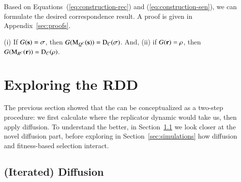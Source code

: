 \documentclass[fleqn,reqno,10pt]{article}
\renewcommand{\Smixed}{\ensuremath{\mathrm{\mathbf{s}}}}
\renewcommand{\Rmixed}{\ensuremath{\mathrm{\mathbf{r}}}}
\newcommand{\rdd}{\acro{rdd}} %
\newcommand{\Diff}{\ensuremath{\mathrm{D}}} %
\newcommand{\Mutate}{\ensuremath{\mathrm{M}}} %
\begin{document}
Based on Equations~(\ref{eq:construction-rec}) and
(\ref{eq:construction-sen}), we can formulate the desired
correspondence result. A proof is given in Appendix~\ref{sec:proofs}.

\begin{theorem}
  \label{thm:Correspondence}
  (i) If $G(\Smixed) = \Sstrat$, then $G(\Mutate_{Q^C}(\Smixed)) =
  \Diff_C(\Sstrat)$. And, (ii) if $G(\Rmixed) = \Rstrat$, then
  $G(\Mutate_{R^C}(\Rmixed)) = \Diff_C(\Rstrat)$.
\end{theorem}



\section{Exploring the RDD}
\label{sec:exploring-rdd}

The previous section showed that the \rdd can be conceptualized as a
two-step procedure: we first calculate where the replicator dynamic
would take us, then apply diffusion. To understand the \rdd
better, in Section~\ref{sec:iterated-diffusion} we look closer at the novel
diffusion part, before exploring in Section~\ref{sec:simulations} how
diffusion and fitness-based selection interact.

\subsection{(Iterated) Diffusion}
\label{sec:iterated-diffusion}
\end{document}
